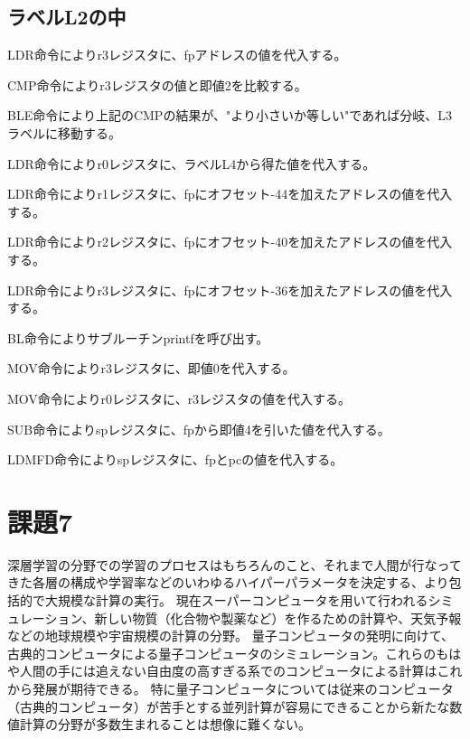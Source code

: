 \documentclass{jsarticle}
\begin{document}
\subsection{ラベルL2の中}

LDR命令によりr3レジスタに、fpアドレスの値を代入する。

CMP命令によりr3レジスタの値と即値2を比較する。

BLE命令により上記のCMPの結果が、"より小さいか等しい"であれば分岐、L3ラベルに移動する。

LDR命令によりr0レジスタに、ラベルL4から得た値を代入する。

LDR命令によりr1レジスタに、fpにオフセット-44を加えたアドレスの値を代入する。

LDR命令によりr2レジスタに、fpにオフセット-40を加えたアドレスの値を代入する。

LDR命令によりr3レジスタに、fpにオフセット-36を加えたアドレスの値を代入する。

BL命令によりサブルーチンprintfを呼び出す。

MOV命令によりr3レジスタに、即値0を代入する。

MOV命令によりr0レジスタに、r3レジスタの値を代入する。

SUB命令によりspレジスタに、fpから即値4を引いた値を代入する。

LDMFD命令によりspレジスタに、fpとpcの値を代入する。

\section{課題7}
深層学習の分野での学習のプロセスはもちろんのこと、それまで人間が行なってきた各層の構成や学習率などのいわゆるハイパーパラメータを決定する、より包括的で大規模な計算の実行。
現在スーパーコンピュータを用いて行われるシミュレーション、新しい物質（化合物や製薬など）を作るための計算や、天気予報などの地球規模や宇宙規模の計算の分野。
量子コンピュータの発明に向けて、古典的コンピュータによる量子コンピュータのシミュレーション。これらのもはや人間の手には追えない自由度の高すぎる系でのコンピュータによる計算はこれから発展が期待できる。
特に量子コンピュータについては従来のコンピュータ（古典的コンピュータ）が苦手とする並列計算が容易にできることから新たな数値計算の分野が多数生まれることは想像に難くない。
\end{document}
